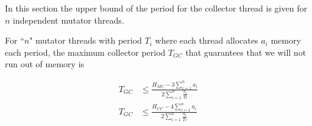 %
%

In this section the upper bound of the period for the collector
thread is given for $n$ independent mutator threads.

\begin{theorem}
\label{sch:theorem}

For ``$n$" mutator threads with period $T_i$ where each thread
allocates $a_i$ memory each period, the maximum collector period
$T_{GC}$ that guarantees that we will not run out of memory is

\begin{align}\label{nth:mc:theorem}
    T_{GC} & \le \frac{H_{MC}-3\sum_{i=1}^{n} a_i}{2\sum_{i=1}^{n} \frac{a_i}{Ti}}\\
    \label{nth:cc:theorem}
    T_{GC} & \le \frac{H_{CC}-4\sum_{i=1}^{n} a_i}{2\sum_{i=1}^{n}
    \frac{a_i}{Ti}}
\end{align}

\end{theorem}

